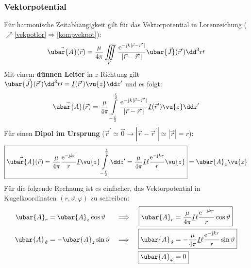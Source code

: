 		  \subsubsection{Vektorpotential}
		  Für harmonische Zeitabhängigkeit gilt für das Vektorpotential in Lorenzeichung ($\nearrow$\ref{vekpotlor}$\Rightarrow$\ref{kompvekpot}):
		        \begin{equation}\label{vekpotdip}
			        \vec{\ubar{A}}(\vec{r} ) = \frac{\mu}{4\pi} \iiint\limits_V \frac{ \mathrm{e}^{-\mathrm{j} k|\vec{r} -\vec{r}^\prime |}}{|\vec{r} -\vec{r}^\prime |} \ubar{\vec{J}}(\vec{r}^\prime ) \dd^3  r\prime
		        \end{equation}
		   Mit einem \textbf{dünnen Leiter} in \(z\)-Richtung gilt \(\ubar{\vec{J}}(\vec{r}^\prime ) \dd^3  r\prime = \underline{I}(\vec{r}^\prime )\vu{z}\dd z^\prime \) und es folgt:
		        \begin{equation}
			        \vec{\ubar{A}}(\vec{r} ) = \frac{\mu}{4\pi} \int\limits_{-\frac{\ell}{2}}^{\frac{\ell}{2}} \frac{ \mathrm{e}^{-\mathrm{j} k |\vec{r} -\vec{r}^\prime |}}{|\vec{r} -\vec{r}^\prime |} \underline{I}(\vec{r}^\prime )\vu{z}\dd z^\prime
		        \end{equation}
		        Für einen \textbf{Dipol im Ursprung} (\(\vec{r}^\prime  \simeq \vec{0} \to |\vec{r} -\vec{r}^\prime | \simeq |\vec{r} |=r\)):
		        \begin{equation}
		        	\boxed{ \vec{\ubar{A}}(\vec{r} ) = \frac{\mu}{4\pi} \frac{ \mathrm{e}^{-\mathrm{j} kr}}{r} \underline{I}\vu{z}\int\limits_{-\frac{\ell}{2}}^{\frac{\ell}{2}} \dd z^\prime = \frac{\mu}{4\pi} \underline{I} \ell  \frac{ \mathrm{e}^{-\mathrm{j} kr}}{r} \vu{z}} =  \ubar{A}_z \vu{z}
		        \end{equation}
		        Für die folgende Rechnung ist es einfacher, das Vektorpotential in Kugelkoordinaten \((r,\vartheta,\varphi)\) zu schreiben:
		        \begin{align}
		        	\ubar{A}_r          & =   \ubar{A}_z  \cos\vartheta    &\implies & &    \Aboxed{ \ubar{A}_r & =  \frac{\mu}{4\pi} \underline{I} \ell  \frac{ \mathrm{e}^{-\mathrm{j} kr}}{r} \cos\vartheta}\\
		        	\ubar{A}_\vartheta &=  - \ubar{A}_z \sin\vartheta         &\implies&& \Aboxed{ \ubar{A}_\vartheta &=  - \frac{\mu}{4\pi} \underline{I} \ell  \frac{ \mathrm{e}^{-\mathrm{j} kr}}{r} \sin\vartheta} \\                                                         &&&&  \Aboxed{ \ubar{A}_\varphi &=0} 
		        \end{align}
